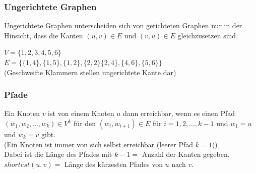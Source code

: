 \documentclass[
../../AuD-Zusammenfassung.tex,
]
{subfiles}
\begin{document}
\subsubsection{Ungerichtete Graphen}
Ungerichtete Graphen unterscheiden sich von gerichteten Graphen nur in der Hinsicht, dass die Kanten $(u,v)\in E$ und $(v,u) \in E$ gleichzusetzen sind.\\
\begin{minipage}[t]{\textwidth}
    \centering
    $V = \{1,2,3,4,5,6\}$\\
    $E = \{\{1,4\},\{1,5\},\{1,2\},\{2,2\}\{2,4\},\{4,6\},\{5,6\}\}$\\
    (Geschweifte Klammern stellen ungerichtete Kante dar)
\end{minipage}
\subsubsection{Pfade}
Ein Knoten $v$ ist von einem Knoten $u$ dann erreichbar, wenn es einen Pfad $(w_1,w_2,\ldots,w_k) \in V^k$ für den $(w_i,w_{i+1}) \in E$ für $i = 1,2,\ldots,k - 1$ und $w_1 = u$ und $w_k = v$ gibt.\\
(Ein Knoten ist immer von sich selbst erreichbar (leerer Pfad $k = 1$))\\
Dabei ist die Länge des Pfades mit $k - 1 =$ Anzahl der Kanten gegeben. $shortest(u,v) =$ Länge des kürzesten Pfades von $u$ nach $v$. 
\newpage
\end{document}
